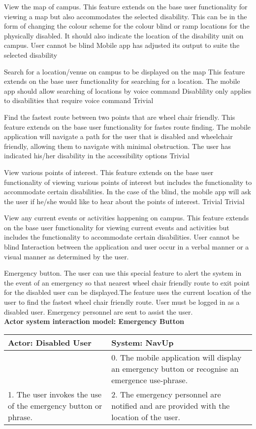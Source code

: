 \FuncReq
{View the map of campus.}
{This feature extends on the base user functionality for viewing a map but also accommodates the selected disability. This can be in the form of changing the colour scheme for the colour blind or ramp locations for the physically disabled. It should also indicate the location of the disability unit on campus.}
{User cannot be blind}
{Mobile app has adjusted its output to suite the selected disability}

\FuncReq
{Search for a location/venue on campus to be displayed on the map}
{This feature extends on the base user functionality for searching for a location. The mobile app should allow searching of locations by voice command}
{Disablility only applies to disabilities that require voice command}
{Trivial}

\FuncReq
{Find the fastest route between two points that are wheel chair friendly.}%
{This feature extends on the base user functionality for fastes route finding. The mobile application will navigate a path for the user that is disabled and wheelchair friendly, allowing them to navigate with minimal obstruction.}
{The user has indicated his/her disability in the accessibility options}
{Trivial}

\FuncReq
{View various points of interest.}
{This feature extends on the base user functionality of viewing various points of interest but includes the functionality to accommodate certain disabilities. In the case of the blind, the mobile app will ask the user if he/she would like to hear about the points of interest.}
{Trivial}
{Trivial}

\FuncReq
{View any current events or activities happening on campus.}
{This feature extends on the base user functionality for viewing current events and activities but includes the functionality to accommodate certain disabilities.}
{User cannot be blind}
{Interaction between the application and user occur in a verbal manner or a visual manner as determined by the user.}

\FuncReq
{Emergency button.}
{The user can use this special feature to alert the system in the event of an emergency so that nearest wheel chair friendly route to exit point for the disabled user can be displayed.The feature uses the current location of the user to find the fastest wheel chair friendly route.}
{User must be logged in as a disabled user.}
{Emergency personnel are sent to assist the user.}
    \\
    \textbf{Actor system interaction model: Emergency Button}\\
    \begin{tabular}{ | p{6cm} | p{6cm} |}
    \hline
    Actor: Disabled User & System: NavUp \\ \hline
     & 0. The mobile application will display an emergency button or recognise an emergence use-phrase.\\ \hline
    1. The user invokes the use of the emergency button or phrase. & 2. The emergency personnel are notified and are provided with the location of the user.\\ \hline   
    \end{tabular}
\\
\bigskip
